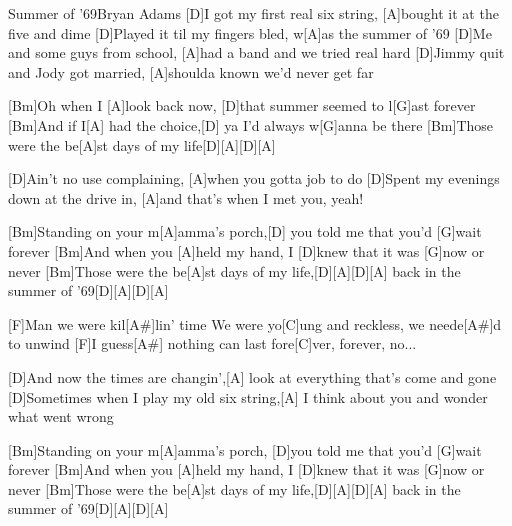 \documentclass[../main.tex]{subfiles}
\begin{document}
\begin{song}{Summer of '69}{Bryan Adams}{}
[D]I got my first real six string, [A]bought it at the five and dime
[D]Played it til my fingers bled, w[A]as the summer of '69
[D]Me and some guys from school, [A]had a band and we tried real hard
[D]Jimmy quit and Jody got married, [A]shoulda known we'd never get far

[Bm]Oh when I [A]look back now, [D]that summer seemed to l[G]ast forever
[Bm]And if I[A] had the choice,[D] ya I'd always w[G]anna be there
[Bm]Those were the be[A]st days of my life[D]{\hh}[A]{\hh}[D]{\hh}[A]{\hh}

[D]Ain't no use complaining, [A]when you gotta job to do
[D]Spent my evenings down at the drive in, [A]and that's when I met you, yeah!

[Bm]Standing on your m[A]amma's porch,[D] you told me that you'd [G]wait forever
[Bm]And when you [A]held my hand, I [D]knew that it was [G]now or never
[Bm]Those were the be[A]st days of my life,[D]{\hh}[A]{\hh}[D]{\hh}[A]{\hh}
back in the summer of '69[D]{\hh}[A]{\hh}[D]{\hh}[A]{\hh}

[F]Man we were kil[A#]lin' time
We were yo[C]ung and reckless, we neede[A#]d to unwind
[F]I guess[A#] nothing can last fore[C]ver, forever, no...

[D]And now the times are changin',[A] look at everything that's come and gone
[D]Sometimes when I play my old six string,[A] I think about you and wonder what went wrong

[Bm]Standing on your m[A]amma's porch, [D]you told me that you'd [G]wait forever
[Bm]And when you [A]held my hand, I [D]knew that it was [G]now or never
[Bm]Those were the be[A]st days of my life,[D]{\hh}[A]{\hh}[D]{\hh}[A]{\hh}
back in the summer of '69[D]{\hh}[A]{\hh}[D]{\hh}[A]{\hh}
\end{song}
\end{document}
